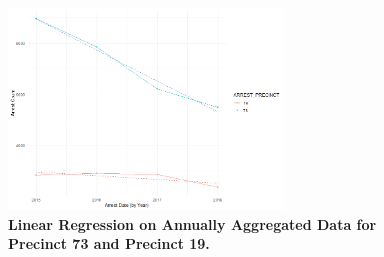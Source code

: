 \documentclass[11pt]{article}\usepackage[]{graphicx}\usepackage[]{color}
\begin{document}
\begin{figure}[H]
  \centering
    \includegraphics[width=0.65\textwidth]{BrownUEStrend.png}
  \caption{\textbf{Linear Regression on Annually Aggregated Data for Precinct 73 and Precinct 19.}}
  \label{fig:BrownUEStrend}
\end{figure}
\end{document}
